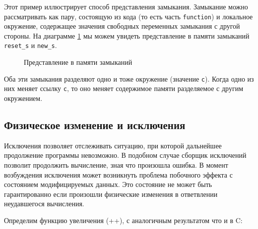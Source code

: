 Этот пример иллюстрирует способ представления замыкания. Замыкание можно
рассматривать как пару, состоящую из кода (то есть часть \texttt{function}) и
локальное окружение, содержащее значения свободных переменных замыкания с другой
стороны. На диаграмме \ref{fig:memory_representation_of_closures} мы можем
увидеть представление в памяти замыканий \texttt{reset\_s} и \texttt{new\_s}.

\begin{figure}[h]
	\caption{Представление в памяти замыканий}
	\label{fig:memory_representation_of_closures}
\end{figure}

Оба эти замыкания разделяют одно и тоже окружение (значение \texttt{c}). Когда
одно из них меняет ссылку \texttt{c}, то оно меняет содержимое памяти
разделяемое с другим окружением.

\subsection{Физическое изменение и исключения}
\label{subsec:physical_modifications_and_exceptions}

 Исключения позволяет отслеживать ситуацию, при которой дальнейшее продолжение
программы невозможно. В подобном случае сборщик исключений позволит продолжить
вычисление, зная что произошла ошибка. В момент возбуждения исключения может
возникнуть проблема побочного эффекта с состоянием модифицируемых данных. Это
состояние не может быть гарантированно если произошли физические изменения в
ответвлении неудавшегося вычисления.

Определим функцию увеличения (++), с аналогичным результатом что и в C:

